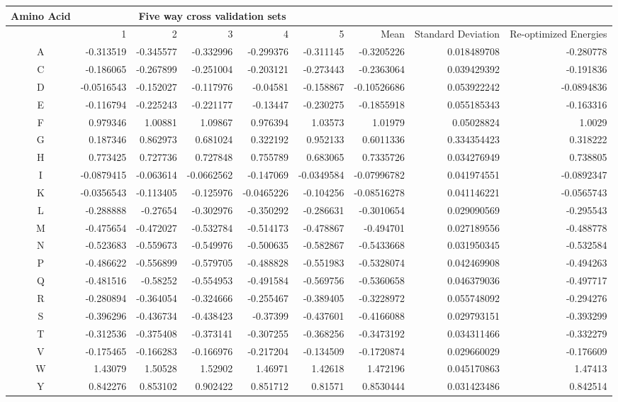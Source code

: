 \begin{tabular}{|c|r|r|r|r|r|r|r|r|}
\hline
 Amino Acid & \multicolumn{5}{c|}{Five way cross validation sets} & & &  \\
\hline
 & 1 & 2 & 3 & 4 & 5 & Mean & Standard Deviation & Re-optimized Energies \\
\hline
A & -0.313519 & -0.345577 & -0.332996 & -0.299376 & -0.311145 & -0.3205226 & 0.018489708 & -0.280778\\
\hline
C & -0.186065 & -0.267899 & -0.251004 & -0.203121 & -0.273443 & -0.2363064 & 0.039429392 & -0.191836\\
\hline
D & -0.0516543 & -0.152027 & -0.117976 & -0.04581 & -0.158867 & -0.10526686 & 0.053922242 & -0.0894836\\
\hline
E & -0.116794 & -0.225243 & -0.221177 & -0.13447 & -0.230275 & -0.1855918 & 0.055185343 & -0.163316\\
\hline
F & 0.979346 & 1.00881 & 1.09867 & 0.976394 & 1.03573 & 1.01979 & 0.05028824 & 1.0029\\
\hline
G & 0.187346 & 0.862973 & 0.681024 & 0.322192 & 0.952133 & 0.6011336 & 0.334354423 & 0.318222\\
\hline
H & 0.773425 & 0.727736 & 0.727848 & 0.755789 & 0.683065 & 0.7335726 & 0.034276949 & 0.738805\\
\hline
I & -0.0879415 & -0.063614 & -0.0662562 & -0.147069 & -0.0349584 & -0.07996782 & 0.041974551 & -0.0892347\\
\hline
K & -0.0356543 & -0.113405 & -0.125976 & -0.0465226 & -0.104256 & -0.08516278 & 0.041146221 & -0.0565743\\
\hline
L & -0.288888 & -0.27654 & -0.302976 & -0.350292 & -0.286631 & -0.3010654 & 0.029090569 & -0.295543\\
\hline
M & -0.475654 & -0.472027 & -0.532784 & -0.514173 & -0.478867 & -0.494701 & 0.027189556 & -0.488778\\
\hline
N & -0.523683 & -0.559673 & -0.549976 & -0.500635 & -0.582867 & -0.5433668 & 0.031950345 & -0.532584\\
\hline
P & -0.486622 & -0.556899 & -0.579705 & -0.488828 & -0.551983 & -0.5328074 & 0.042469908 & -0.494263\\
\hline
Q & -0.481516 & -0.58252 & -0.554953 & -0.491584 & -0.569756 & -0.5360658 & 0.046379036 & -0.497717\\
\hline
R & -0.280894 & -0.364054 & -0.324666 & -0.255467 & -0.389405 & -0.3228972 & 0.055748092 & -0.294276\\
\hline
S & -0.396296 & -0.436734 & -0.438423 & -0.37399 & -0.437601 & -0.4166088 & 0.029793151 & -0.393299\\
\hline
T & -0.312536 & -0.375408 & -0.373141 & -0.307255 & -0.368256 & -0.3473192 & 0.034311466 & -0.332279\\
\hline
V & -0.175465 & -0.166283 & -0.166976 & -0.217204 & -0.134509 & -0.1720874 & 0.029660029 & -0.176609\\
\hline
W & 1.43079 & 1.50528 & 1.52902 & 1.46971 & 1.42618 & 1.472196 & 0.045170863 & 1.47413\\
\hline
Y & 0.842276 & 0.853102 & 0.902422 & 0.851712 & 0.81571 & 0.8530444 & 0.031423486 & 0.842514\\
\hline

\end{tabular}
